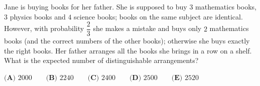 Jane is buying books for her father. She is supposed to buy $3$ mathematics books, $3$ physics books and $4$ science books; books on the same subject are identical. However, with probability $\dfrac23$ she makes a mistake and buys only $2$ mathematics books (and the correct numbers of the other books); otherwise she buys exactly the right books. Her father arranges all the books she brings in a row on a shelf. What is the expected number of distinguishable arrangements?

$\textbf{(A) } 2000 \qquad \textbf{(B) } 2240 \qquad \textbf{(C) } 2400 \qquad \textbf{(D) } 2500 \qquad \textbf{(E) } 2520$
